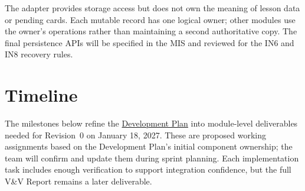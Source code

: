 \documentclass[12pt, titlepage]{article}
\begin{document}
The adapter provides storage access but does not own the meaning of
lesson data or pending cards. Each mutable record has one logical
owner; other modules use the owner's operations rather than maintaining
a second authoritative copy. The final persistence APIs will be
specified in the MIS and reviewed for the IN6 and IN8 recovery rules.

\section{Timeline} \label{SecTimeline}

The milestones below refine the
\href{https://github.com/rhea333/LingoLyrics/blob/main/docs/DevelopmentPlan/DevelopmentPlan.tex}
{Development Plan} into module-level deliverables needed for Revision~0
on January 18, 2027. These are proposed working assignments based on the
Development Plan's initial component ownership; the team will confirm
and update them during sprint planning. Each implementation task
includes enough verification to support integration confidence, but
the full V\&V Report remains a later deliverable.
\end{document}
